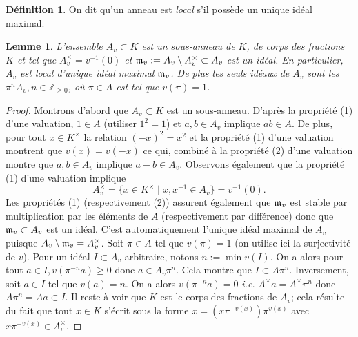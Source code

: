 \documentclass[a4paper, oneside, 12pt]{book}
\theoremstyle{theoremeStyle} %
\newtheorem{lemme}[theoreme]{Lemme}
\theoremstyle{definition} %
\newtheorem{definition}[theoreme]{Définition}
\newcommand{\ie}{\textit{i.e.}} %
\newcommand{\Z}{\mathbb{Z}}
\begin{document}
\begin{definition}
On dit qu'un anneau est \textit{local} s'il possède un unique idéal maximal.
\end{definition}

\begin{lemme}\label{AVD}
  L'ensemble $A_v \subset K$ est un sous-anneau de $K$, de corps des fractions $K$ et tel que $A_v^\times=v^{-1}(0)$ et $\frak{m}_v:= A_v\setminus A_v^\times \subset A_v$ est un idéal. En particulier, $A_v$ est local d'unique idéal maximal $\frak{m}_v$. De plus les seuls idéaux de $A_v$ sont les $\pi^nA_v, n\in\Z_{\geq 0}$, où $\pi\in A$ est tel que $v(\pi)=1$.
\end{lemme}

\begin{proof} Montrons d'abord que $A_v\subset K$ est un sous-anneau. D'après la propriété (1) d'une valuation, $1\in A$ (utiliser $1^2=1$) et $a,b\in A_v$ implique $ab\in A$. De plus, pour tout $x\in K^\times$  la relation $(-x)^2=x^2$ et la propriété (1) d'une valuation montrent que $v(x)=v(-x)$ ce qui, combiné à la propriété (2) d'une valuation montre que $a,b\in A_v$ implique $a-b\in A_v$. Observons également que la propriété (1) d'une valuation implique $$A_v^\times=\{x\in K^\times\;|\; x,x^{-1}\in A_v\} = v^{-1}(0).$$
  Les propriétés (1) (respectivement (2)) assurent également que $\frak{m}_v$ est stable par multiplication par les éléments de $A$ (respectivement par différence) donc que $\frak{m}_v\subset A_v$ est un idéal. C'est automatiquement l'unique idéal maximal de $A_v$ puisque $A_v\setminus \frak{m}_v=A_v^\times$.
  Soit $\pi\in A$ tel que $v(\pi)=1$ (on utilise ici la surjectivité de $v$). Pour un idéal $I\subset A_v$ arbitraire, notons $n:=\min{v(I)}$. On a alors pour tout $a\in I, v(\pi^{-n}a)\geq 0$ donc $a\in A_v\pi^n$. Cela montre que $I\subset A\pi^n$. Inversement, soit $a\in I$ tel que $v(a)=n$. On a alors $v(\pi^{-n}a)=0$ \ie{} $A^\times a=A^\times \pi^n$ donc $A\pi^n=Aa\subset I$. Il reste à voir que $K$ est le corps des fractions de $A_v$; cela résulte du fait que tout $x\in K$ s'écrit sous la forme $x=(x\pi^{-v(x)})\pi^{v(x)}$ avec $ x\pi^{-v(x)}\in A_v^\times$. %
\end{proof}
\end{document}
